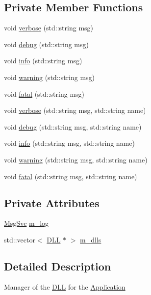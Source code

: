 \subsection*{Private Member Functions}
\begin{DoxyCompactItemize}
\item 
void \hyperlink{classDLLMgr_a47c406fbca0df2aaa8569e0e99927d32}{verbose} (std\+::string msg)
\item 
void \hyperlink{classDLLMgr_ad5f2427768e6cfe25c255e7899e4203f}{debug} (std\+::string msg)
\item 
void \hyperlink{classDLLMgr_a14b8e15b87602027c0a11f91173bebed}{info} (std\+::string msg)
\item 
void \hyperlink{classDLLMgr_ad8a177de233cda457b5566e4ff3bb50e}{warning} (std\+::string msg)
\item 
void \hyperlink{classDLLMgr_ac45919d4588b964a7ca3a8e2abed3cc2}{fatal} (std\+::string msg)
\item 
void \hyperlink{classDLLMgr_a7a7c039320f83aac50f315ed608d67e3}{verbose} (std\+::string msg, std\+::string name)
\item 
void \hyperlink{classDLLMgr_aef993dc0eea2972286957dda940ccdf2}{debug} (std\+::string msg, std\+::string name)
\item 
void \hyperlink{classDLLMgr_ac6468f1f9079b683ce5fe60e1d697dda}{info} (std\+::string msg, std\+::string name)
\item 
void \hyperlink{classDLLMgr_a84fc9787ced567adb5695fc1d7c275b8}{warning} (std\+::string msg, std\+::string name)
\item 
void \hyperlink{classDLLMgr_add7f622101c74721181402ba26072668}{fatal} (std\+::string msg, std\+::string name)
\end{DoxyCompactItemize}
\subsection*{Private Attributes}
\begin{DoxyCompactItemize}
\item 
\hyperlink{classMsgSvc}{Msg\+Svc} \hyperlink{classDLLMgr_a64b523faed64378451ee76f6fbf0800d}{m\+\_\+log}
\item 
std\+::vector$<$ \hyperlink{classDLL}{D\+LL} $\ast$ $>$ \hyperlink{classDLLMgr_a5bd713edea21d64f32aa71162bca581a}{m\+\_\+dlls}
\end{DoxyCompactItemize}


\subsection{Detailed Description}
Manager of the \hyperlink{classDLL}{D\+LL} for the \hyperlink{classApplication}{Application}


